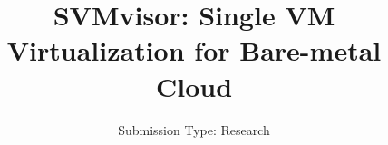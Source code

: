 \documentclass[10pt,twocolumn]{article}
\begin{document}
\title{SVMvisor: Single VM Virtualization for Bare-metal Cloud}
\author{
\small Submission Type: Research
}
\date{}
\maketitle


\vspace{-0.1in}

\vspace{-0.1in}

\vspace{-0.1in}

\vspace{-0.1in}

\vspace{-0.1in}

\vspace{-0.1in}

\vspace{-0.1in}




\end{document}
